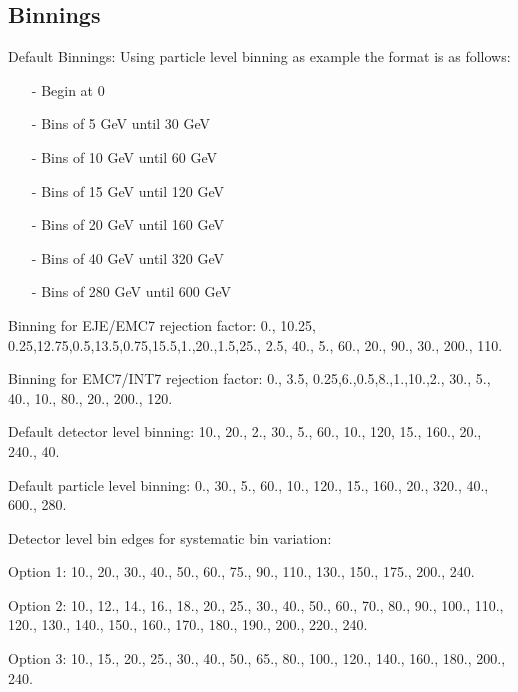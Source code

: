 \documentclass[ALICE]{ALICE_analysis_notes}
\providecommand{\DIFaddend}{} %
\DeclareRobustCommand{\DIFaddend}{\DIFOaddend \let\includegraphics\DIFOincludegraphics} %
\begin{document}
\begin{appendix}
\newpage

\DIFaddend \section{Binnings}
\label{sec:appendixSysBinVar}

Default Binnings:
Using particle level binning as example the format is as follows:
\begin{itemize}
    \item[-] Begin at 0
    \item[-] Bins of 5 GeV until 30 GeV
    \item[-] Bins of 10 GeV until 60 GeV
    \item[-] Bins of 15 GeV until 120 GeV
    \item[-] Bins of 20 GeV until 160 GeV
    \item[-] Bins of 40 GeV until 320 GeV
    \item[-] Bins of 280 GeV until 600 GeV
\end{itemize}

Binning for EJE/EMC7 rejection factor:
0., {{10.25, 0.25},{12.75,0.5},{13.5,0.75},{15.5,1.},{20.,1.5},{25., 2.5}, {40., 5.}, {60., 20.}, {90., 30.}, {200., 110.}}

\bigskip

Binning for EMC7/INT7 rejection factor:
0., {{3.5, 0.25},{6.,0.5},{8.,1.},{10.,2.}, {30., 5.}, {40., 10.}, {80., 20.}, {200., 120.}}

\bigskip

Default detector level binning:
10., {{20., 2.}, {30., 5.}, {60., 10.}, {120, 15.}, {160., 20.}, {240., 40.}}

\bigskip

Default particle level binning:
0., {{30., 5.}, {60., 10.}, {120., 15.}, {160., 20.}, {320., 40.}, {600., 280.}}

\bigskip

Detector level bin edges for systematic bin variation:

\bigskip

Option 1:
10., 20., 30., 40., 50., 60., 75., 90., 110., 130., 150., 175., 200., 240.

\bigskip

Option 2:
10., 12., 14., 16., 18., 20., 25., 30., 40., 50., 60., 70., 80., 90., 100., 110., 120., 130., 140., 150., 160., 170., 180., 190., 200., 220., 240.

\bigskip

Option 3:
10., 15., 20., 25., 30., 40., 50., 65., 80., 100., 120., 140., 160., 180., 200., 240.


\end{appendix}
\end{document}
